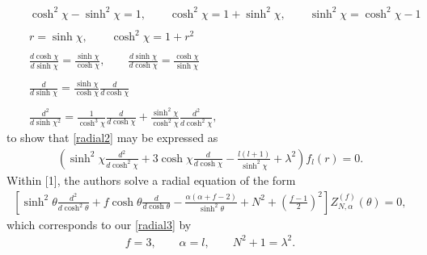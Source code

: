\documentclass[10pt,letterpaper]{article}
\numberwithin{equation}{section}
\begin{document}
\begin{eqnarray}
&& \cosh^2\chi-\sinh^2\chi = 1,\qquad \cosh^2\chi = 1+\sinh^2\chi,\qquad \sinh^2\chi = \cosh^2\chi -1
\nonumber\\ \nonumber\\
&&r= \sinh\chi,\qquad \cosh^2\chi = 1+r^2
\nonumber\\ \nonumber\\
&&\frac{d\cosh\chi}{d\sinh\chi} = \frac{\sinh\chi}{\cosh\chi},\qquad \frac{d\sinh\chi}{d\cosh\chi}= \frac{\cosh\chi}{\sinh\chi}
\nonumber\\ \nonumber\\
&&\frac{d}{d\sinh\chi} = \frac{\sinh \chi}{\cosh\chi}\frac{d}{d\cosh\chi}
\nonumber\\ \nonumber\\
&& \frac{d^2}{d\sinh\chi^2}  = \frac{1}{\cosh^3\chi}\frac{d}{d\cosh\chi}+ \frac{\sinh^2\chi}{\cosh^2\chi}\frac{d^2}{d\cosh^2\chi},
\end{eqnarray}
to show that \eqref{radial2} may be expressed as
\begin{eqnarray}
\left(\sinh^2\chi \frac{d^2}{d\cosh^2\chi} + 3\cosh\chi\frac{d}{d\cosh\chi}-\frac{l(l+1)}{\sinh^2\chi}+\lambda^2 \right)f_l(r)=0.
\label{radial3}
\end{eqnarray}
Within [1], the authors solve a radial equation of the form
\begin{eqnarray}
\left[\sinh^2\theta \frac{d^2}{d\cosh^2\theta} + f\cosh\theta \frac{d}{d\cosh\theta}-\frac{\alpha(\alpha+f-2)}{\sinh^2\theta} + N^2 + \left(\frac{f-1}{2}\right)^2\right]Z_{N,\alpha}^{(f)}(\theta)=0,
\end{eqnarray}
which corresponds to our \eqref{radial3} by
\begin{eqnarray}
f=3,\qquad \alpha=l,\qquad N^2+1 = \lambda^2.
\end{eqnarray}
\end{document}
